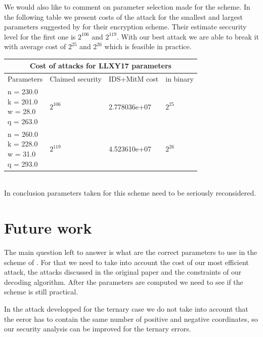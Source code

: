 \documentclass[12pt]{article}
\begin{document}
We would also like to comment on parameter selection made for the scheme. In the following table we present costs of the attack for the smallest and largest parameters suggested by \cite{[LLXY17]} for their encryption scheme. Their estimate seccurity level for the first one is $2^{106}$ and $2^{119}$. With our best attack we are able to break it with average cost of $2^{25}$ and $2^{26}$ which is feasible in practice. \\


\begin{tabular}{ |l||p{}|p{}|p{}| }
 \hline
 \multicolumn{4}{|c|}{Cost of attacks for LLXY17 parameters } \\
 \hline
 Parameters & Claimed security & IDS+MitM cost & in binary \\
 \hline
 \makecell{n = 230.0 \\ k = 201.0 \\ w = 28.0 \\ q = 263.0} & $2^{106}$ & 2.778036e+07 & $2^{25}$ \\
 \hline
 \makecell{n = 260.0 \\ k = 228.0 \\ w = 31.0 \\ q = 293.0} & $2^{119}$ & 4.523610e+07 & $2^{26}$ \\
 \hline
\end{tabular}
\\

In conclusion parameters taken for this scheme need to be seriously reconsidered.

\section{Future work}

The main question left to answer is what are the correct parameters to use in the scheme of \cite{[LLXY17]}. For that we need to take into account the cost of our most efficient attack, the attacks discussed in the original paper and the constraints of our decoding algorithm. After the parameters are computed we need to see if the scheme is still practical.

In the attack developped for the ternary case we do not take into account that the eeror has to contain the same number of positive and negative coordinates, so our security analysis can be improved for the ternary errors.


\appendix
\end{document}
